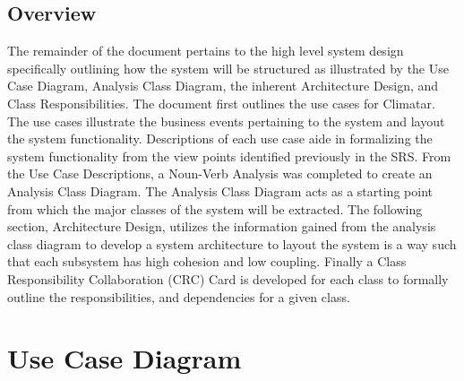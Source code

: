 \documentclass[]{article}
\begin{document}
\subsection{Overview}
\label{sub:overview}
The remainder of the document pertains to the high level system design specifically outlining how the system will be structured as illustrated by the Use Case Diagram, Analysis Class Diagram, the inherent Architecture Design, and Class Responsibilities. The document first outlines the use cases for Climatar. The use cases illustrate the business events pertaining to the system and layout the system functionality. Descriptions of each use case aide in formalizing the system functionality from the view points identified previously in the SRS. From the Use Case Descriptions, a Noun-Verb Analysis was completed to create an Analysis Class Diagram. The Analysis Class Diagram acts as a starting point from which the major classes of the system will be extracted. The following section, Architecture Design, utilizes the information gained from the analysis class diagram to develop a system architecture to layout the system is a way such that each subsystem has high cohesion and low coupling. Finally a Class Responsibility Collaboration (CRC) Card is developed for each class to formally outline the responsibilities, and dependencies for a given class.

\vspace{20mm}


\section{Use Case Diagram}
\label{sec:use_case_diagram}
\end{document}
